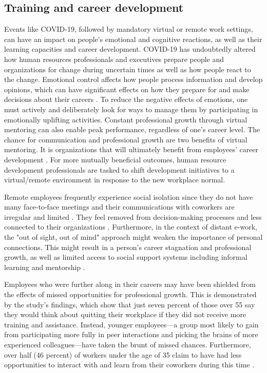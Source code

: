 \documentclass[12pt]{article}
\begin{document}
\subsection*{Training and career development}

Events like COVID-19, followed by mandatory virtual or remote work settings, can have an impact on people's emotional and cognitive reactions, as well as their learning capacities and career development. COVID-19 has undoubtedly altered how human resources professionals and executives prepare people and organizations for change during uncertain times as well as how people react to the change. Emotional control affects how people process information and develop opinions, which can have significant effects on how they prepare for and make decisions about their careers \cite{Restubog2020}. To reduce the negative effects of emotions, one must actively and deliberately look for ways to manage them by participating in emotionally uplifting activities. Constant professional growth through virtual mentoring can also enable peak performance, regardless of one's career level. The chance for communication and professional growth are two benefits of virtual mentoring. It is organizations that will ultimately benefit from employees’ career development \cite{Yarberry2021}.  For more mutually beneficial outcomes, human resource development professionals are tasked to shift development initiatives to a virtual/remote environment in response to the new workplace normal.

Remote employees frequently experience social isolation since they do not have many face-to-face meetings and their communications with coworkers are irregular and limited \cite{Park2021}. They feel removed from decision-making processes and less connected to their organizations \cite{Virick2010}. Furthermore, in the context of distant e-work, the "out of sight, out of mind" approach might weaken the importance of personal connections. This might result in a person's career stagnation and professional growth, as well as limited access to social support systems including informal learning and mentorship \cite{Smith2018}.

Employees who were further along in their careers may have been shielded from the effects of missed opportunities for professional growth. This is demonstrated by the study's findings, which show that just seven percent of those over 55 say they would think about quitting their workplace if they did not receive more training and assistance. Instead, younger employees—a group most likely to gain from participating more fully in peer interactions and picking the brains of more experienced colleagues—have taken the brunt of missed chances. Furthermore, over half (46 percent) of workers under the age of 35 claim to have had less opportunities to interact with and learn from their coworkers during this time \cite{Kairinos2022}.
\end{document}

